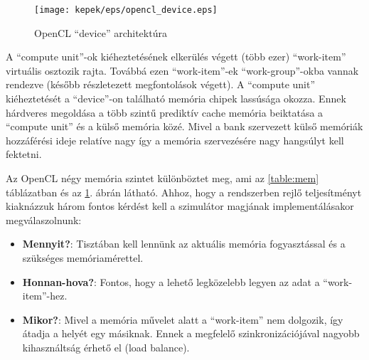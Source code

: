 	\begin{figure}[!ht]
		\centering
		\texttt{[image: kepek/eps/opencl\_device.eps]}
		\caption{\scriptsize OpenCL ``device'' architektúra \cite{opencl}} 
		\label{fig:device} 
	\end{figure}
	
	A ``compute unit''-ok kiéheztetésének elkerülés végett (több ezer)
	``work-item'' virtuális osztozik rajta.
	Továbbá ezen ``work-item''-ek ``work-group''-okba vannak rendezve (később
	részletezett megfontolások végett).
	A ``compute unit'' kiéheztetését a ``device''-on található memória chipek lassúsága okozza.
	Ennek hárdveres megoldása a több szintű prediktív cache memória beiktatása a
	``compute unit'' és a külső memória közé.
	Mivel a bank szervezett külső memóriák hozzáférési ideje relatíve nagy
	így a memória szervezésére nagy hangsúlyt kell fektetni.
	
	Az OpenCL négy memória szintet különböztet meg, ami az
	\ref{table:mem} táblázatban és az \ref{fig:device}. ábrán látható.
	Ahhoz, hogy a rendszerben rejlő teljesítményt kiaknázzuk három fontos kérdést
	kell a szimulátor magjának implementálásakor megválaszolnunk:
	\begin{itemize}
		\item \textbf{Mennyit?}: Tisztában kell lennünk az aktuális
		memória fogyasztással és a szükséges memóriamérettel.
		\item \textbf{Honnan-hova?}: Fontos, hogy a lehető legközelebb legyen az adat
		a ``work-item''-hez.
		\item \textbf{Mikor?}: Mivel a memória művelet alatt a ``work-item'' nem
		dolgozik, így átadja a helyét egy másiknak. Ennek a megfelelő
		szinkronizációjával nagyobb kihasználtság érhető el (load balance).
	\end{itemize}
	
	\begin{table}[!h]
	\renewcommand{\arraystretch}{1.3}
	\caption{\scriptsize OpenCL memória szintek}
	\label{table:mem}
	\centering
	\end{table}
	

